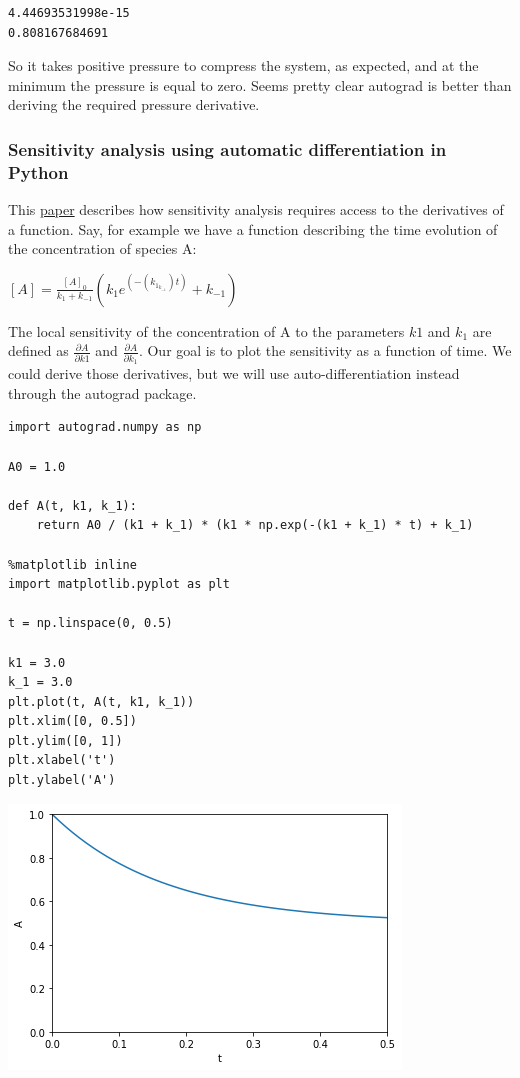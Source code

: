 \documentclass[11pt]{article}
\begin{document}
\begin{verbatim}
4.44693531998e-15
0.808167684691

\end{verbatim}

So it takes positive pressure to compress the system, as expected, and at the minimum the pressure is equal to zero. Seems pretty clear autograd is better than deriving the required pressure derivative.
\subsubsection{Sensitivity analysis using automatic differentiation in Python}
\label{sec:orga8aaf6f}

This \href{http://citeseerx.ist.psu.edu/viewdoc/download?doi=10.1.1.428.6699\&rep=rep1\&type=pdf}{paper} describes how sensitivity analysis requires access to the derivatives of a function. Say, for example we have a function describing the time evolution of the concentration of species A:

\([A] = \frac{[A]_0}{k_1 + k_{-1}} (k_1 e^{(-(k_1 _ k_{-1})t)} + k_{-1})\)

The local sensitivity of the concentration of A to the parameters \(k1\) and \(k_1\) are defined as \(\frac{\partial A}{\partial k1}\) and \(\frac{\partial A}{\partial k_1}\). Our goal is to plot the sensitivity as a function of time. We could derive those derivatives, but we will use auto-differentiation instead through the autograd package.

\begin{verbatim}
import autograd.numpy as np

A0 = 1.0

def A(t, k1, k_1):
    return A0 / (k1 + k_1) * (k1 * np.exp(-(k1 + k_1) * t) + k_1)

%matplotlib inline
import matplotlib.pyplot as plt

t = np.linspace(0, 0.5)

k1 = 3.0
k_1 = 3.0
plt.plot(t, A(t, k1, k_1))
plt.xlim([0, 0.5])
plt.ylim([0, 1])
plt.xlabel('t')
plt.ylabel('A')
\end{verbatim}

\begin{center}
\includegraphics[width=.9\linewidth]{obipy-resources/bedd9c33d1d348d762ec8e845109beab-22007_mY.png}
\end{center}
\end{document}
